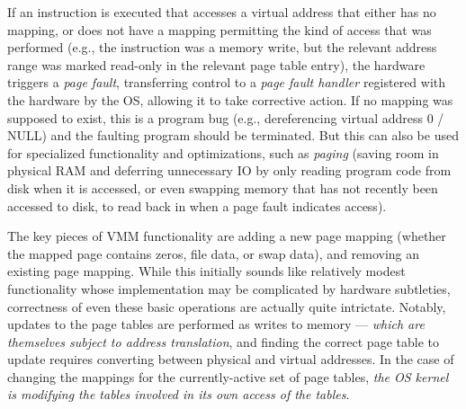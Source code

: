 
If an instruction is executed that accesses a virtual address that either has no mapping, or does not have a mapping permitting 
the kind of access that was performed (e.g., the instruction was a memory write, but the relevant address range was marked read-only in
the relevant page table entry), the hardware triggers a \emph{page fault}, transferring control to a \emph{page fault handler} registered 
with the hardware by the OS, allowing it to take corrective action.
If no mapping was supposed to exist, this is a program bug (e.g., dereferencing virtual address 0 / NULL)
and the faulting program should be terminated. But this can also be used for
specialized functionality and optimizations, such as \emph{paging} (saving room in physical RAM and deferring
unnecessary IO by only reading program code from disk when it is accessed, or even swapping memory that has not
recently been accessed to disk, to read back in when a page fault indicates access).

The key pieces of VMM functionality are
adding a new page mapping (whether the mapped page contains zeros, file data, or swap data), and removing an existing 
page mapping.
While this initially sounds like relatively modest functionality whose implementation may be complicated by hardware 
subtleties, correctness of even these basic operations are actually quite intrictate.
Notably, updates to the page tables are performed as writes to memory --- \emph{which are themselves subject to address translation},
and finding the correct page table to update requires converting between physical and virtual addresses.
In the case of changing the mappings for the currently-active set of page tables, 
\emph{the OS kernel is modifying the tables involved in its
own access of the tables}.

